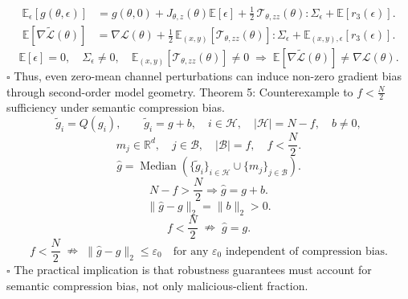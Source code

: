 \documentclass[10pt,journal]{IEEEtran}
\begin{document}
\begin{equation}
\begin{aligned}
\mathbb{E}_{\epsilon}[g(\theta,\epsilon)]
&=
g(\theta,0)
+
J_{\theta,z}(\theta)\mathbb{E}[\epsilon]
+
\frac{1}{2}\,\mathcal{T}_{\theta,zz}(\theta):\Sigma_\epsilon
+
\mathbb{E}[r_3(\epsilon)].
\end{aligned}
\end{equation}
\begin{equation}
\begin{aligned}
\mathbb{E}[\nabla \tilde{\mathcal{L}}(\theta)]
&=
\nabla \mathcal{L}(\theta)
+
\frac{1}{2}\,\mathbb{E}_{(x,y)}\left[\mathcal{T}_{\theta,zz}(\theta)\right]:\Sigma_\epsilon
+
\mathbb{E}_{(x,y),\epsilon}[r_3(\epsilon)].
\end{aligned}
\end{equation}
\begin{equation}
\mathbb{E}[\epsilon]=0,
\quad
\Sigma_\epsilon\neq 0,
\quad
\mathbb{E}_{(x,y)}\left[\mathcal{T}_{\theta,zz}(\theta)\right]\neq 0
\;
\Longrightarrow
\;
\mathbb{E}[\nabla \tilde{\mathcal{L}}(\theta)] \neq \nabla \mathcal{L}(\theta).
\end{equation}
\hfill $\square$
Thus, even zero-mean channel perturbations can induce non-zero gradient bias through second-order model geometry.
Theorem 5: Counterexample to $f<\frac{N}{2}$ sufficiency under semantic compression bias.
\begin{equation}
\tilde{g}_i = Q(g_i),
\qquad
\tilde{g}_i = g + b,
\quad i\in\mathcal{H},
\quad |\mathcal{H}|=N-f,
\quad b\neq 0,
\end{equation}
\begin{equation}
m_j \in \mathbb{R}^d,
\quad j\in\mathcal{B},
\quad |\mathcal{B}|=f,
\quad
f<\frac{N}{2}.
\end{equation}
\begin{equation}
\hat{g} = \operatorname{Median}\left(\{\tilde{g}_i\}_{i\in\mathcal{H}} \cup \{m_j\}_{j\in\mathcal{B}}\right).
\end{equation}
\begin{equation}
N-f > \frac{N}{2}
\Longrightarrow
\hat{g}=g+b.
\end{equation}
\begin{equation}
\|\hat{g}-g\|_2 = \|b\|_2 > 0.
\end{equation}
\begin{equation}
f<\frac{N}{2}
\;\nRightarrow\;
\hat{g}=g.
\end{equation}
\begin{equation}
f<\frac{N}{2}
\;\nRightarrow\;
\|\hat{g}-g\|_2 \le \varepsilon_0
\quad
\text{for any } \varepsilon_0 \text{ independent of compression bias}.
\end{equation}
\hfill $\square$
The practical implication is that robustness guarantees must account for semantic compression bias, not only malicious-client fraction.
\end{document}
